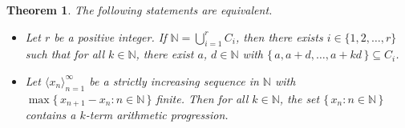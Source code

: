 \documentclass[12pt,showtrims]{memoir}
\theoremstyle{plain}
\newtheorem{thm}{Theorem}[section]
\theoremstyle{definition}
\newcommand{\la}{\langle}
\newcommand{\ra}{\rangle}
\newcommand{\bbN}{\mathbb{N}}
\begin{document}
\begin{thm}
  \label{thm:vdwEqSyn}
  The following statements are equivalent.
  \begin{itemize}
    \item[(a)] Let $r$ be a positive integer.
      If $\bbN = \bigcup_{i=1}^r C_i$, then there exists $i \in \{1, 2, \ldots, r\}$ such that for all $k \in \bbN$, there exist $a$, $d \in \bbN$ with $\{\, a, a+d, \ldots, a+k d \,\} \subseteq C_i$. 

    \item[(b)] Let $\la x_n \ra_{n=1}^\infty$ be a strictly increasing sequence in $\bbN$ with $\max\{\, x_{n+1} - x_n : n \in \bbN \,\}$ finite.
      Then for all $k \in \bbN$, the set $\{\, x_n : n \in \bbN \,\}$ contains a $k$-term arithmetic progression.
  \end{itemize}
\end{thm}
\end{document}
